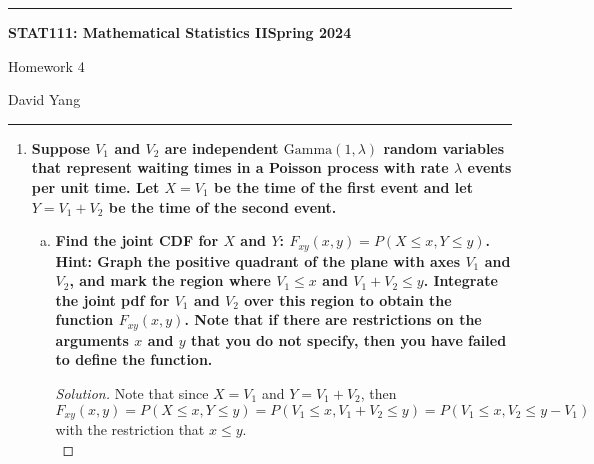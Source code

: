 \documentclass[11pt]{article}
\newenvironment{solution}
  {\renewcommand\qedsymbol{$\blacksquare$}\begin{proof}[Solution]}
  {\end{proof}}
\begin{document}
	\hrule
	\begin{center}
        \textbf{STAT111: Mathematical Statistics II}\hfill \textbf{Spring 2024}\newline

		{\Large Homework 4}

		David Yang
	\end{center}

\hrule

\vspace{1em}

\begin{enumerate}
    \item \textbf{Suppose $V_1$ and $V_2$ are independent $\mathrm{Gamma}(1, \lambda)$ random variables that represent waiting
    times in a Poisson process with rate $\lambda$ events per unit time. Let $X = V_1$ be the time of the
    first event and let $Y = V_1 + V_2$ be the time of the second event.}

    \begin{enumerate}[a)]
      \item \textbf{Find the joint CDF for $X$ and $Y$: $F_{xy}(x, y) = P(X \leq x, Y \leq y)$. Hint: Graph the positive quadrant of the plane
      with axes $V_1$ and $V_2$, and mark the region where $V_1 \leq x$ and $V_1 + V_2 \leq y$. Integrate the joint pdf for $V_1$ and $V_2$ over this region to obtain the function $F_{xy}(x, y)$.
      Note that if there are restrictions on the arguments $x$ and $y$ that you do not specify, then you have failed to define the function.} 

      \begin{solution}
      Note that since $X = V_1$ and $Y = V_1 + V_2$, then 
      \[
        F_{xy}(x, y) = P(X \leq x, Y \leq y) = P(V_1 \leq x, V_1 + V_2 \leq y) = P(V_1 \leq x, V_2 \leq y - V_1)
      \]
      with the restriction that $x \leq y$. \\


\end{solution}
\end{enumerate}
\end{enumerate}
\end{document}
